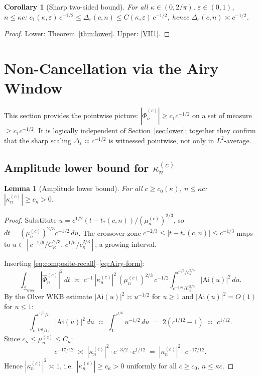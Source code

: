 \documentclass[12pt,a4paper]{amsart}
\newtheorem{lemma}[theorem]{Lemma}
\newtheorem{corollary}[theorem]{Corollary}
\theoremstyle{definition}
\theoremstyle{remark}
\newcommand{\Phihat}{\widehat{\Phi}}
\newcommand{\Ai}{\mathrm{Ai}}
\newcommand{\Zcross}{\mathcal{Z}_{\mathrm{cross}}}
\newcommand{\tstar}{t_*(c,n)}
\begin{document}
\begin{corollary}[Sharp two-sided bound]
\label{cor:sharp}
For all $\kappa\in(0,2/\pi)$, $\varepsilon\in(0,1)$,
$n\le\kappa c$:
$c_1(\kappa,\varepsilon)\,c^{-1/2}
\le\Delta_\varepsilon(c,n)
\le C(\kappa,\varepsilon)\,c^{-1/2}$,
hence $\Delta_\varepsilon(c,n)\asymp c^{-1/2}$.
\end{corollary}

\begin{proof}
Lower: Theorem~\ref{thm:lower}.
Upper: \eqref{VII1}.
\end{proof}

\section{Non-Cancellation via the Airy Window}
\label{sec:nc}

This section provides the pointwise picture:
$|\Phihat_n^{(c)}|\ge c_1 c^{-1/2}$ on a set of
measure $\ge c_1 c^{-1/2}$.
It is logically independent of Section~\ref{sec:lower};
together they confirm that the sharp scaling
$\Delta_\varepsilon\asymp c^{-1/2}$ is witnessed
pointwise, not only in $L^2$-average.

\subsection{Amplitude lower bound for $\kappa_n^{(c)}$}

\begin{lemma}[Amplitude lower bound]
\label{lem:kappa-lower}
For all $c\ge c_0(\kappa)$, $n\le\kappa c$:
$|\kappa_n^{(c)}|\ge c_\kappa>0$.
\end{lemma}

\begin{proof}
Substitute $u = c^{1/2}(t-\tstar)/(\mu_n^{(c)})^{2/3}$,
so $dt = (\mu_n^{(c)})^{2/3} c^{-1/2}\,du$.
The crossover zone $c^{-2/3}\le|t-\tstar|\le c^{-1/3}$
maps to $u\in[c^{-1/6}/C_\kappa^{2/3},\,c^{1/6}/c_\kappa^{2/3}]$,
a growing interval.

Inserting \eqref{eq:composite-recall}--\eqref{eq:Airy-form}:
\[
  \int_{\Zcross}|\Phihat_n^{(c)}|^2\,dt
  \;\asymp\;
  c^{-1}\,|\kappa_n^{(c)}|^2\,(\mu_n^{(c)})^{2/3}\,c^{-1/2}
  \int_{c^{-1/6}/C_\kappa^{2/3}}^{c^{1/6}/c_\kappa^{2/3}}|\Ai(u)|^2\,du.
\]
By the Olver WKB estimate $|\Ai(u)|^2\asymp u^{-1/2}$
for $u\ge 1$ \cite{Olver1974} and $|\Ai(u)|^2=O(1)$
for $u\le 1$:
\[
  \int_{c^{-1/6}/C}^{c^{1/6}/c}|\Ai(u)|^2\,du
  \;\asymp\;
  \int_1^{c^{1/6}} u^{-1/2}\,du
  \;=\; 2(c^{1/12}-1)
  \;\asymp\; c^{1/12}.
\]
Since $c_\kappa\le\mu_n^{(c)}\le C_\kappa$:
\[
  c^{-17/12}
  \;\asymp\;
  |\kappa_n^{(c)}|^2 \cdot c^{-3/2} \cdot c^{1/12}
  \;=\;
  |\kappa_n^{(c)}|^2 \cdot c^{-17/12}.
\]
Hence $|\kappa_n^{(c)}|^2\asymp 1$,
i.e.\ $|\kappa_n^{(c)}|\ge c_\kappa>0$
uniformly for all $c\ge c_0$, $n\le\kappa c$.
\end{proof}
\end{document}
